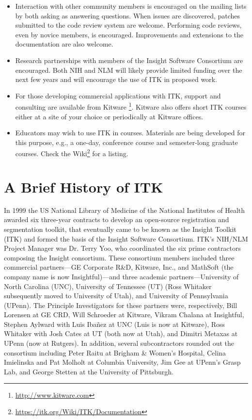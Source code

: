 \begin{itemize}
       \item Interaction with other community members is encouraged on the
       mailing lists by both asking as answering questions. When issues are
       discovered, patches submitted to the code review system are welcome.
       Performing code reviews, even by novice members, is encouraged.
       Improvements and extensions to the documentation are also welcome.

       \item Research partnerships with members of the Insight Software
       Consortium are encouraged. Both NIH and NLM will likely provide
       limited funding over the next few years and will encourage the use of
       ITK in proposed work.

       \item For those developing commercial applications with ITK, support
       and consulting are available from Kitware \footnote{\url{http://www.kitware.com}}.
       Kitware also offers short ITK courses either at a site of your choice
       or periodically at Kitware offices.

       \item Educators may wish to use ITK in courses. Materials are being
       developed for this purpose, e.g., a one-day, conference course and
       semester-long graduate courses. Check the
       Wiki\footnote{\url{https://itk.org/Wiki/ITK/Documentation}} for a listing.
\end{itemize}

\section{A Brief History of ITK}
\label{sec:History}

In 1999 the US National Library of Medicine of the National Institutes of
Health awarded six three-year contracts to develop an open-source
registration and segmentation toolkit, that eventually came to be known as
the Insight Toolkit (ITK) and formed the basis of the Insight Software
Consortium. ITK's NIH/NLM Project Manager was Dr. Terry Yoo, who coordinated the
six prime contractors composing the Insight consortium. These consortium
members included three commercial partners---GE Corporate R\&D, Kitware,
Inc., and MathSoft (the company name is now Insightful)---and three academic
partners---University of North Carolina (UNC), University of Tennessee (UT)
(Ross Whitaker subsequently moved to University of Utah), and University of
Pennsylvania (UPenn). The Principle Investigators for these partners were,
respectively, Bill Lorensen at GE CRD, Will Schroeder at Kitware, Vikram
Chalana at Insightful, Stephen Aylward with Luis Iba\~{n}ez at UNC (Luis is now
at Kitware), Ross Whitaker with Josh Cates at UT (both now at Utah), and
Dimitri Metaxas at UPenn (now at Rutgers). In addition, several
subcontractors rounded out the consortium including Peter Raitu at Brigham \&
Women's Hospital, Celina Imielinska and Pat Molholt at Columbia University,
Jim Gee at UPenn's Grasp Lab, and George Stetten at the University of
Pittsburgh.

